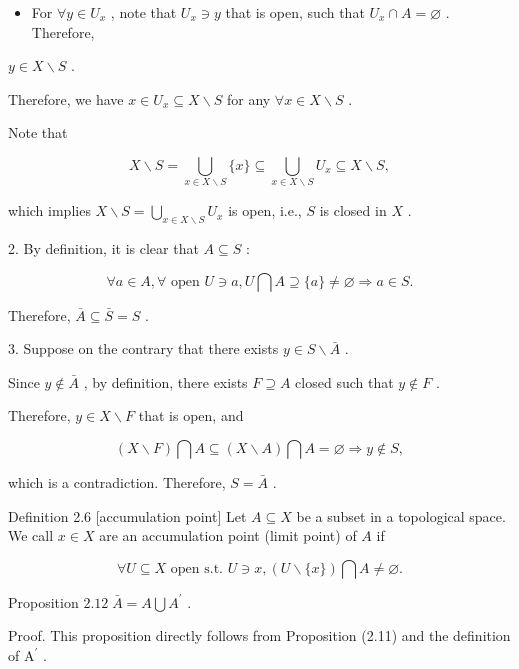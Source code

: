 \begin{itemize}
\item For \(\forall y \in  {U}_{x}\) , note that \({U}_{x} \ni  y\) that is open, such that \({U}_{x} \cap  A = \varnothing\) . Therefore,
\end{itemize}

\(y \in  X \smallsetminus  S\) .

Therefore, we have \(x \in  {U}_{x} \subseteq  X \smallsetminus  S\) for any \(\forall x \in  X \smallsetminus  S\) .

Note that

\[
X \smallsetminus  S = \mathop{\bigcup }\limits_{{x \in  X \smallsetminus  S}}\{ x\}  \subseteq  \mathop{\bigcup }\limits_{{x \in  X \smallsetminus  S}}{U}_{x} \subseteq  X \smallsetminus  S,
\]

which implies \(X \smallsetminus  S = \mathop{\bigcup }\limits_{{x \in  X \smallsetminus  S}}{U}_{x}\) is open, i.e., \(S\) is closed in \(X\) .

2. By definition, it is clear that \(A \subseteq  S\) :

\[
\forall a \in  A,\forall \text{ open }U \ni  a,U\bigcap A \supseteq  \{ a\}  \neq  \varnothing  \Rightarrow  a \in  S.
\]

Therefore, \(\bar{A} \subseteq  \bar{S} = S\) .

3. Suppose on the contrary that there exists \(y \in  S \smallsetminus  \bar{A}\) .

Since \(y \notin  \bar{A}\) , by definition, there exists \(F \supseteq  A\) closed such that \(y \notin  F\) .

Therefore, \(y \in  X \smallsetminus  F\) that is open, and

\[
\left( {X \smallsetminus  F}\right) \bigcap A \subseteq  \left( {X \smallsetminus  A}\right) \bigcap A = \varnothing  \Rightarrow  y \notin  S,
\]

which is a contradiction. Therefore, \(S = \bar{A}\) .

Definition 2.6 [accumulation point] Let \(A \subseteq  X\) be a subset in a topological space. We call \(x \in  X\) are an accumulation point (limit point) of \(A\) if

\[
\forall U \subseteq  X\text{ open s.t. }U \ni  x,\left( {U\smallsetminus \{ x\} }\right) \bigcap A \neq  \varnothing .
\]

Proposition \({2.12}\;\bar{A} = A\bigcup {A}^{\prime }\) .

Proof. This proposition directly follows from Proposition (2.11) and the definition of \({\mathrm{A}}^{\prime }\) .

